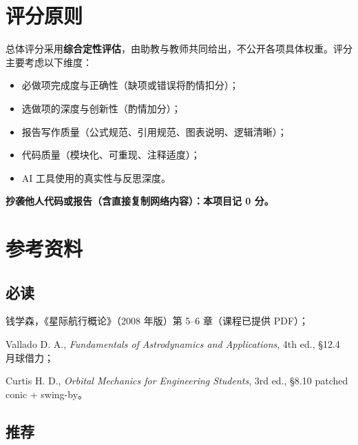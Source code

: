 \documentclass[11pt,a4paper]{ctexart}
\begin{document}
\section{评分原则}

总体评分采用\textbf{综合定性评估}，由助教与教师共同给出，不公开各项具体权重。评分主要考虑以下维度：

\begin{itemize}[leftmargin=*]
    \item 必做项完成度与正确性（缺项或错误将酌情扣分）；
    \item 选做项的深度与创新性（酌情加分）；
    \item 报告写作质量（公式规范、引用规范、图表说明、逻辑清晰）；
    \item 代码质量（模块化、可重现、注释适度）；
    \item AI 工具使用的真实性与反思深度。
\end{itemize}

\begin{warnbox}[硬性惩罚]
\textbf{抄袭他人代码或报告（含直接复制网络内容）：本项目记 0 分。}
\end{warnbox}

\section{参考资料}

\subsection*{必读}

\begin{enumerate}[label={[\arabic*]}]
    \item 钱学森，《星际航行概论》（2008 年版）第 5--6 章（课程已提供 PDF）；
    \item Vallado D. A., \textit{Fundamentals of Astrodynamics and Applications}, 4th ed., §12.4 月球借力；
    \item Curtis H. D., \textit{Orbital Mechanics for Engineering Students}, 3rd ed., §8.10 patched conic + swing-by。
\end{enumerate}

\subsection*{推荐}
\end{document}
